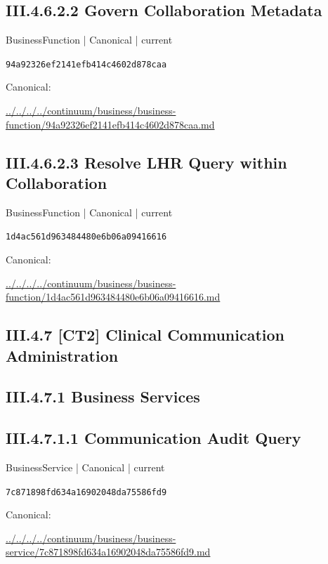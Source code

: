 \documentclass[10pt,a4paper]{article}
\begin{document}
\subsection*{III.4.6.2.2 Govern Collaboration Metadata}
{\small BusinessFunction | Canonical | current}\par
\texttt{94a92326ef2141efb414c4602d878caa}\par
Canonical: \par
{\footnotesize\url{../../../../continuum/business/business-function/94a92326ef2141efb414c4602d878caa.md}}\par
\subsection*{III.4.6.2.3 Resolve LHR Query within Collaboration}
{\small BusinessFunction | Canonical | current}\par
\texttt{1d4ac561d963484480e6b06a09416616}\par
Canonical: \par
{\footnotesize\url{../../../../continuum/business/business-function/1d4ac561d963484480e6b06a09416616.md}}\par
\subsection*{III.4.7 [CT2] Clinical Communication Administration}
\subsection*{III.4.7.1 Business Services}
\subsection*{III.4.7.1.1 Communication Audit Query}
{\small BusinessService | Canonical | current}\par
\texttt{7c871898fd634a16902048da75586fd9}\par
Canonical: \par
{\footnotesize\url{../../../../continuum/business/business-service/7c871898fd634a16902048da75586fd9.md}}\par
\end{document}
